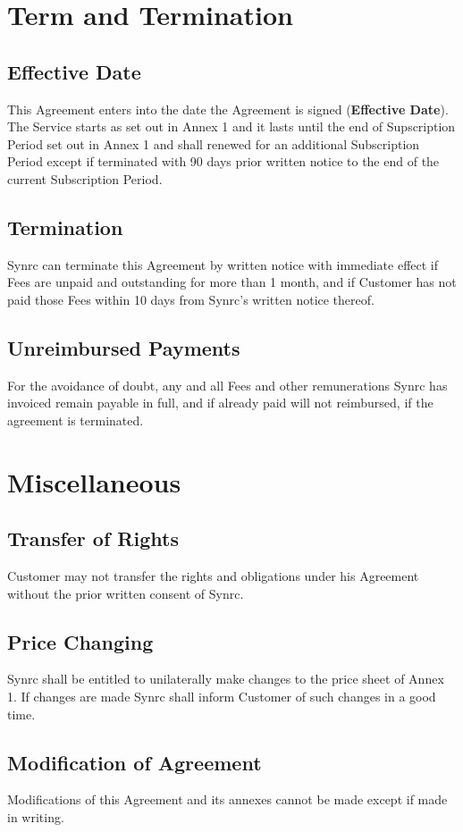 \documentclass[11pt,oneside]{article}
\begin{document}
\section{Term and Termination}
\subsection{Effective Date}
This Agreement enters into the date the Agreement is signed ({\bf Effective Date}).
The Service starts as set out in Annex 1 and it lasts until the end of Supscription Period
set out in Annex 1 and shall renewed for an additional Subscription Period except if
terminated with 90 days prior written notice to the end of the current Subscription Period.
\subsection{Termination}
Synrc can terminate this Agreement by written notice with immediate effect if Fees
are unpaid and outstanding for more than 1 month, and if Customer has not paid those Fees
within 10 days from Synrc's written notice thereof.
\subsection{Unreimbursed Payments}
For the avoidance of doubt, any and all Fees and other remunerations Synrc has
invoiced remain payable in full, and if already paid will not reimbursed,
if the agreement is terminated.

\newpage
\section{Miscellaneous}
\subsection{Transfer of Rights}
Customer may not transfer the rights and obligations under his Agreement
without the prior written consent of Synrc.
\subsection{Price Changing}
Synrc shall be entitled to unilaterally make changes to the price sheet of Annex 1.
If changes are made Synrc shall inform Customer of such changes in a good time.
\subsection{Modification of Agreement}
Modifications of this Agreement and its annexes cannot be made except
if made in writing.
\end{document}
